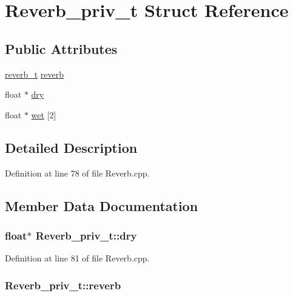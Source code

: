 \hypertarget{struct_reverb__priv__t}{}\section{Reverb\+\_\+priv\+\_\+t Struct Reference}
\label{struct_reverb__priv__t}
\subsection*{Public Attributes}
\begin{DoxyCompactItemize}
\item 
\hyperlink{structreverb__t}{reverb\+\_\+t} \hyperlink{struct_reverb__priv__t_a56ccb1fe9621312a67160284fabad562}{reverb}
\item 
float $\ast$ \hyperlink{struct_reverb__priv__t_a651cb32dffc2dbd24d876879508ece08}{dry}
\item 
float $\ast$ \hyperlink{struct_reverb__priv__t_a2acb868e69006bdad0a970952b03d92b}{wet} \mbox{[}2\mbox{]}
\end{DoxyCompactItemize}


\subsection{Detailed Description}


Definition at line 78 of file Reverb.\+cpp.



\subsection{Member Data Documentation}
\subsubsection[{\texorpdfstring{dry}{dry}}]{\setlength{\rightskip}{0pt plus 5cm}float$\ast$ Reverb\+\_\+priv\+\_\+t\+::dry}\hypertarget{struct_reverb__priv__t_a651cb32dffc2dbd24d876879508ece08}{}\label{struct_reverb__priv__t_a651cb32dffc2dbd24d876879508ece08}


Definition at line 81 of file Reverb.\+cpp.

\subsubsection[{\texorpdfstring{reverb}{reverb}}]{ Reverb\+\_\+priv\+\_\+t\+::reverb}\hypertarget{struct_reverb__priv__t_a56ccb1fe9621312a67160284fabad562}{}\label{struct_reverb__priv__t_a56ccb1fe9621312a67160284fabad562}


